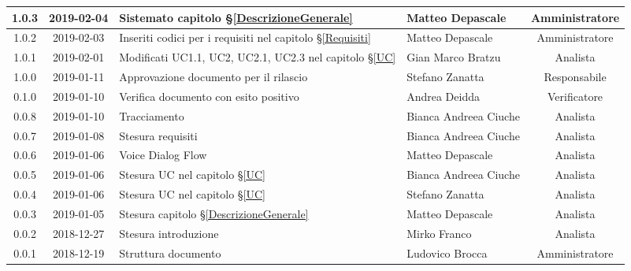 \begin{center}
\begin{tabularx}{\textwidth}{|c|c|X|X|c|}
			\hline
			1.0.3 & 2019-02-04 & Sistemato capitolo \S\ref{DescrizioneGenerale}& Matteo Depascale & Amministratore\\
			\hline
			1.0.2 & 2019-02-03 & Inseriti codici per i requisiti nel capitolo \S\ref{Requisiti}& Matteo Depascale & Amministratore\\
			\hline
			1.0.1 & 2019-02-01 & Modificati UC1.1, UC2, UC2.1, UC2.3 nel capitolo \S\ref{UC}& Gian Marco Bratzu & Analista\\
			\hline
			1.0.0 & 2019-01-11 & Approvazione documento per il rilascio& Stefano Zanatta & Responsabile\\
			\hline
			0.1.0 & 2019-01-10 & Verifica documento con esito positivo& Andrea Deidda & Verificatore\\
			\hline
			0.0.8 & 2019-01-10 & Tracciamento& Bianca Andreea Ciuche& Analista\\
			\hline
			0.0.7 & 2019-01-08 & Stesura requisiti & Bianca Andreea Ciuche& Analista\\
			\hline
			0.0.6 & 2019-01-06 & Voice Dialog Flow & Matteo Depascale & Analista\\
			\hline
			0.0.5 & 2019-01-06 & Stesura UC nel capitolo \S\ref{UC}& Bianca Andreea Ciuche & Analista\\
			\hline
			0.0.4 & 2019-01-06 & Stesura UC nel capitolo \S\ref{UC}& Stefano Zanatta & Analista\\
			\hline
			0.0.3 & 2019-01-05 & Stesura capitolo \S\ref{DescrizioneGenerale}& Matteo Depascale & Analista\\
			\hline
			0.0.2 & 2018-12-27 & Stesura introduzione & Mirko Franco & Analista\\
			\hline
			0.0.1 & 2018-12-19 & Struttura documento & Ludovico Brocca & Amministratore\\
			\hline
		\end{tabularx}
	\end{center}
\newpage